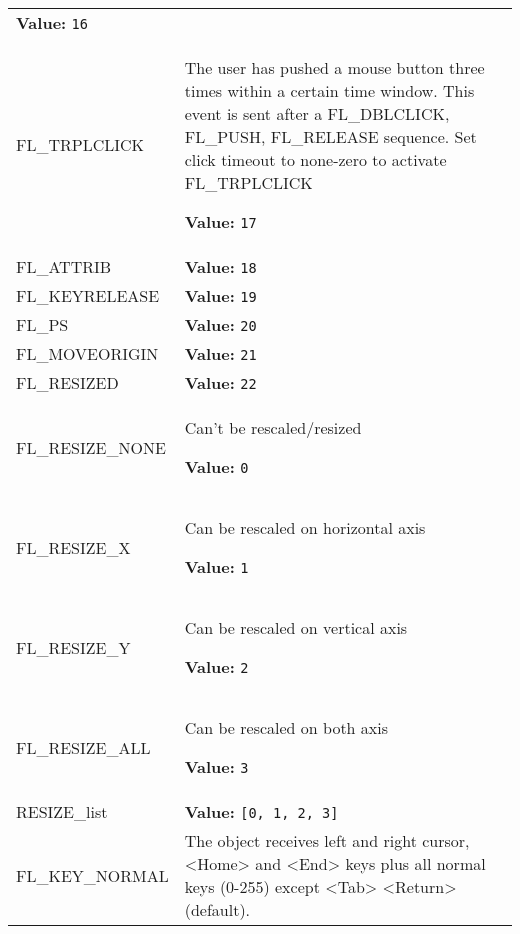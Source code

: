 \begin{longtable}{|p{\varnamewidth}|p{\vardescrwidth}|l}
\textbf{Value:} 
{\tt 16}&\\
\cline{1-2}
\raggedright F\-L\-\_\-T\-R\-P\-L\-C\-L\-I\-C\-K\- & \raggedright The user has pushed a mouse button three times within a certain 
          time window. This event is sent after a FL\_DBLCLICK, FL\_PUSH, 
          FL\_RELEASE sequence. Set click timeout to none-zero to activate 
          FL\_TRPLCLICK

\textbf{Value:} 
{\tt 17}&\\
\cline{1-2}
\raggedright F\-L\-\_\-A\-T\-T\-R\-I\-B\- & \raggedright \textbf{Value:} 
{\tt 18}&\\
\cline{1-2}
\raggedright F\-L\-\_\-K\-E\-Y\-R\-E\-L\-E\-A\-S\-E\- & \raggedright \textbf{Value:} 
{\tt 19}&\\
\cline{1-2}
\raggedright F\-L\-\_\-P\-S\- & \raggedright \textbf{Value:} 
{\tt 20}&\\
\cline{1-2}
\raggedright F\-L\-\_\-M\-O\-V\-E\-O\-R\-I\-G\-I\-N\- & \raggedright \textbf{Value:} 
{\tt 21}&\\
\cline{1-2}
\raggedright F\-L\-\_\-R\-E\-S\-I\-Z\-E\-D\- & \raggedright \textbf{Value:} 
{\tt 22}&\\
\cline{1-2}
\raggedright F\-L\-\_\-R\-E\-S\-I\-Z\-E\-\_\-N\-O\-N\-E\- & \raggedright Can't be rescaled/resized

\textbf{Value:} 
{\tt 0}&\\
\cline{1-2}
\raggedright F\-L\-\_\-R\-E\-S\-I\-Z\-E\-\_\-X\- & \raggedright Can be rescaled on horizontal axis

\textbf{Value:} 
{\tt 1}&\\
\cline{1-2}
\raggedright F\-L\-\_\-R\-E\-S\-I\-Z\-E\-\_\-Y\- & \raggedright Can be rescaled on vertical axis

\textbf{Value:} 
{\tt 2}&\\
\cline{1-2}
\raggedright F\-L\-\_\-R\-E\-S\-I\-Z\-E\-\_\-A\-L\-L\- & \raggedright Can be rescaled on both axis

\textbf{Value:} 
{\tt 3}&\\
\cline{1-2}
\raggedright R\-E\-S\-I\-Z\-E\-\_\-l\-i\-s\-t\- & \raggedright \textbf{Value:} 
{\tt \texttt{[}0\texttt{, }1\texttt{, }2\texttt{, }3\texttt{]}}&\\
\cline{1-2}
\raggedright F\-L\-\_\-K\-E\-Y\-\_\-N\-O\-R\-M\-A\-L\- & \raggedright The object receives left and right cursor, 
          {\textless}Home{\textgreater} and {\textless}End{\textgreater} 
          keys plus all normal keys (0-255) except 
          {\textless}Tab{\textgreater} {\textless}Return{\textgreater} 
          (default).


\end{longtable}
